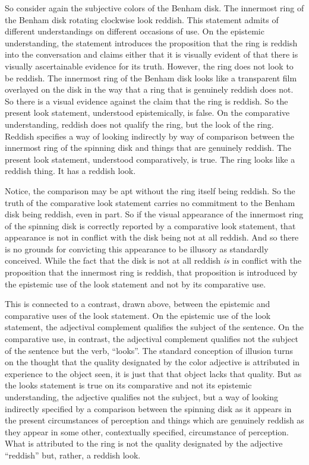 \documentclass[12pt]{article}
\begin{document}
So consider again the subjective colors of the Benham disk. The innermost ring of the Benham disk rotating clockwise look reddish. This statement admits of different understandings on different occasions of use. On the epistemic understanding, the statement introduces the proposition that the ring is reddish into the conversation and claims either that it is visually evident of that there is visually ascertainable evidence for its truth. However, the ring does not look to be reddish. The innermost ring of the Benham disk looks like a transparent film overlayed on the disk in the way that a ring that is genuinely reddish does not. So there is a visual evidence against the claim that the ring is reddish. So the present look statement, understood epistemically, is false. On the comparative understanding, reddish does not qualify the ring, but the look of the ring. Reddish specifies a way of looking indirectly by way of comparison between the innermost ring of the spinning disk and things that are genuinely reddish. The present look statement, understood comparatively, is true. The ring looks like a reddish thing. It has a reddish look.

Notice, the comparison may be apt without the ring itself being reddish. So the truth of the comparative look statement carries no commitment to the Benham disk being reddish, even in part. So if the visual appearance of the innermost ring of the spinning disk is correctly reported by a comparative look statement, that appearance is not in conflict with the disk being not at all reddish. And so there is no grounds for convicting this appearance to be illusory as standardly conceived. While the fact that the disk is not at all reddish \emph{is} in conflict with the proposition that the innermost ring is reddish, that proposition is introduced by the epistemic use of the look statement and not by its comparative use. 

This is connected to a contrast, drawn above, between the epistemic and comparative uses of the look statement. On the epistemic use of the look statement, the adjectival complement qualifies the subject of the sentence. On the comparative use, in contrast, the adjectival complement qualifies not the subject of the sentence but the verb, ``looks''. The standard conception of illusion turns on the thought that the quality designated by the color adjective is attributed in experience to the object seen, it is just that that object lacks that quality. But as the looks statement is true on its comparative and not its epistemic understanding, the adjective qualifies not the subject, but a way of looking indirectly specified by a comparison between the spinning disk as it appears in the present circumstances of perception and things which are genuinely reddish as they appear in some other, contextually specified, circumstance of perception. What is attributed to the ring is not the quality designated by the adjective ``reddish'' but, rather, a reddish look.
\end{document}
